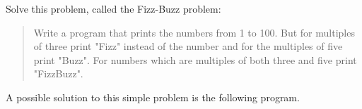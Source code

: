 \begin{Exercise}[title={FizzBuzz},difficulty=1]
\label{ex:fizzbuzz}
\Question \label{ex:fizzbuzz q1} Solve this problem, called
the Fizz-Buzz \cite{fizzbuzz} problem:
\begin{quote}
Write a program that prints the numbers from 1 to 100. But for multiples
of three print "Fizz" instead of the number and for the multiples of
five print "Buzz". For numbers which are multiples of both three and
five print "FizzBuzz".
\end{quote}
\end{Exercise}

\begin{Answer}
\Question A possible
solution to this simple problem is the following program.

\showremarks
\end{Answer}
